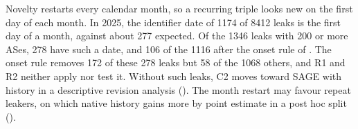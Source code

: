 Novelty restarts every calendar month, so a recurring triple looks new on the first day of each month.
In 2025, the identifier date of \num{1174} of \num{8412} leaks is the first day of a month, against about 277 expected.
Of the \num{1346} leaks with 200 or more ASes, 278 have such a date, and 106 of the \num{1116} after the onset rule of .
The onset rule removes 172 of these 278 leaks but 58 of the \num{1068} others, and R1 and R2 neither apply nor test it.
Without such leaks, C2 moves toward SAGE with history in a descriptive revision analysis ().
The month restart may favour repeat leakers, on which native history gains more by point estimate in a post hoc split ().

